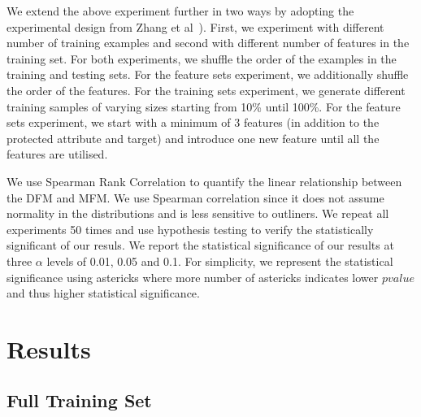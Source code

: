 \documentclass{article}
\begin{document}

We extend the above experiment further in two ways by adopting the
experimental design from Zhang et al \cite{zhang2021ignorance}).
First, we experiment with different number of training examples and
second with different number of features in the training set. For both
experiments, we shuffle the order of the examples in the training and
testing sets. For the feature sets experiment, we additionally shuffle
the order of the features. For the training sets experiment, we
generate different training samples of varying sizes starting from
10\% until 100\%. For the feature sets experiment, we start with a
minimum of 3 features (in addition to the protected attribute and
target) and introduce one new feature until all the features are
utilised.

We use Spearman Rank Correlation to quantify the linear relationship
between the DFM and MFM. We use Spearman correlation since it does not
assume normality in the distributions and is less sensitive to
outliners. We repeat all experiments 50 times and use hypothesis
testing to verify the statistically significant of our resuls. We
report the statistical significance of our results at three $\alpha$
levels of 0.01, 0.05 and 0.1. For simplicity, we represent the
statistical significance using astericks where more number of
astericks indicates lower $pvalue$ and thus higher statistical
significance.


\section{Results}\label{sec:results}

\subsection{Full Training Set}\label{sec:results-full-data}
\end{document}
